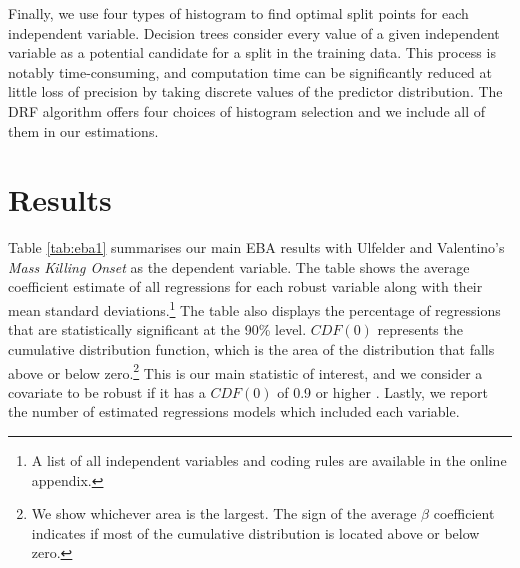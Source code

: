 Finally, we use four types of histogram to find optimal split points for each independent variable. Decision trees consider every value of a given independent variable as a potential candidate for a split in the training data. This process is notably time-consuming, and computation time can be significantly reduced at little loss of precision by taking discrete values of the predictor distribution. The DRF algorithm offers four choices of histogram selection and we include all of them in our estimations.

\section{Results}
\label{sec:results4}

Table \ref{tab:eba1} summarises our main EBA results with Ulfelder and Valentino's \citeyear{ulfelder2008assessing} \textit{Mass Killing Onset} as the dependent variable. The table shows the average coefficient estimate of all regressions for each robust variable along with their mean standard deviations.\footnote{A list of all independent variables and coding rules are available in the online appendix.} The table also displays the percentage of regressions that are statistically significant at the 90\% level. $CDF(0)$ represents the cumulative distribution function, which is the area of the distribution that falls above or below zero.\footnote{We show whichever area is the largest. The sign of the average $\beta$ coefficient indicates if most of the cumulative distribution is located above or below zero.} This is our main statistic of interest, and we consider a covariate to be robust if it has a $CDF(0)$ of 0.9 or higher \citep[181]{sala1997just}. Lastly, we report the number of estimated regressions models which included each variable.

\vspace{1cm}

